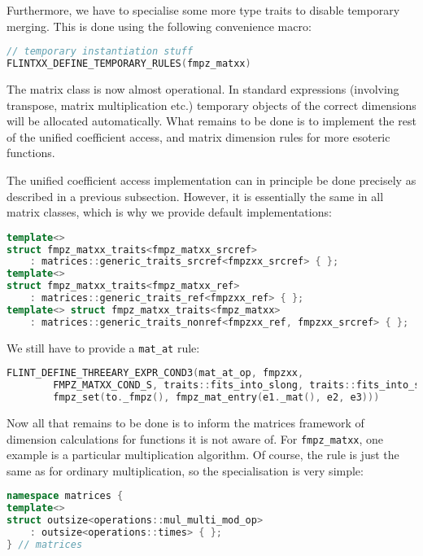 \documentclass[a4paper,10pt]{book}
\newcommand{\code}{\lstinline}
\begin{document}
{{Furthermore, we have to specialise some more type traits to disable temporary
merging. This is done using the following convenience macro:

\begin{lstlisting}[language=c++]
// temporary instantiation stuff
FLINTXX_DEFINE_TEMPORARY_RULES(fmpz_matxx)
\end{lstlisting}

The matrix class is now almost operational. In standard expressions (involving
transpose, matrix multiplication etc.) temporary objects of the correct dimensions
will be allocated automatically. What remains to be done is to implement the rest of
the unified coefficient access, and matrix dimension rules for more esoteric
functions.

The unified coefficient access implementation can in principle be done precisely
as described in a previous subsection.
However, it is essentially the same in all matrix classes,
which is why we provide default implementations:

\begin{lstlisting}[language=c++]
template<>
struct fmpz_matxx_traits<fmpz_matxx_srcref>
    : matrices::generic_traits_srcref<fmpzxx_srcref> { };
template<>
struct fmpz_matxx_traits<fmpz_matxx_ref>
    : matrices::generic_traits_ref<fmpzxx_ref> { };
template<> struct fmpz_matxx_traits<fmpz_matxx>
    : matrices::generic_traits_nonref<fmpzxx_ref, fmpzxx_srcref> { };
\end{lstlisting}

We still have to provide a \code{mat_at} rule:

\begin{lstlisting}[language=c++]
FLINT_DEFINE_THREEARY_EXPR_COND3(mat_at_op, fmpzxx,
        FMPZ_MATXX_COND_S, traits::fits_into_slong, traits::fits_into_slong,
        fmpz_set(to._fmpz(), fmpz_mat_entry(e1._mat(), e2, e3)))
\end{lstlisting}

Now all that remains to be done is to inform the matrices framework of dimension
calculations for functions it is not aware of. For \code{fmpz_matxx}, one
example is a particular multiplication algorithm. Of course, the rule is just
the same as for ordinary multiplication, so the specialisation is very simple:

\begin{lstlisting}[language=c++]
namespace matrices {
template<>
struct outsize<operations::mul_multi_mod_op>
    : outsize<operations::times> { };
} // matrices
\end{lstlisting}

}}
\end{document}
